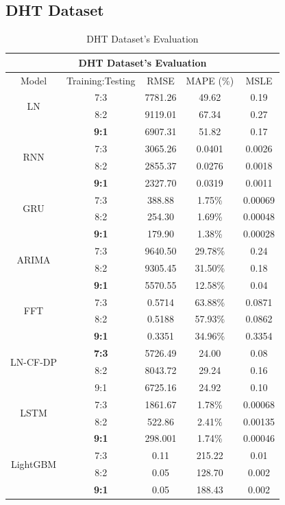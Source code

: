 \documentclass{ieeeojies}
\begin{document}
\vspace{-1em}

\subsection{DHT Dataset} 
\begin{table}[H]
    \centering
    \begin{tabular}{|c|c|c|c|c|}
         \hline
         \multicolumn{5}{|c|}{\textbf{DHT Dataset's Evaluation}}\\
         \hline
         \centering Model & Training:Testing & RMSE & MAPE (\%) & MSLE\\
         \hline
         \multirow{2}{*}{LN}& 7:3 & 7781.26 & 49.62 & 0.19\\ & 8:2 & 9119.01 & 67.34 & 0.27\\ & \textbf{9:1}& 6907.31& 51.82 & 0.17\\
         \hline
         \multirow{2}{*}{RNN} & 7:3&3065.26&0.0401&0.0026\\ & 8:2&2855.37&0.0276&0.0018\\ & \textbf{9:1} &2327.70 &0.0319 & 0.0011\\
         \hline
         \multirow{2}{*}{GRU} & 7:3	& 388.88 & 1.75\% & 0.00069 \\ & 8:2 & 254.30 & 1.69\% & 0.00048 \\ & \textbf{9:1} & 179.90 & 1.38\% & 0.00028 \\
         \hline
         \multirow{2}{*}{ARIMA} & 7:3 & 9640.50 & 29.78\% &0.24 \\ & 8:2 & 9305.45 &31.50\% & 0.18\\ & \textbf{9:1} &5570.55 &12.58\% & 0.04\\
         \hline
         \multirow{2}{*}{FFT}& 7:3	& 0.5714& 63.88\%& 0.0871\\ & 8:2 & 0.5188& 57.93\%& 0.0862\\ & \textbf{9:1} & 0.3351& 34.96\%& 0.3354\\
         \hline
        \multirow{2}{*}{LN-CF-DP} & \textbf{7:3} & 5726.49&24.00&0.08 \\ & 8:2 &8043.72& 29.24& 0.16\\ & 9:1 &6725.16&24.92&0.10\\
         \hline
         \multirow{2}{*}{LSTM}& 7:3& 1861.67& 1.78\%& 0.00068\\ & 8:2 & 522.86& 2.41\%& 0.00135\\ & \textbf{9:1}& 298.001& 1.74\%& 0.00046\\
         \hline
         \multirow{2}{*}{LightGBM}& 7:3& 0.11& 215.22 & 0.01\\ & 8:2 & 0.05& 128.70 & 0.002\\ & \textbf{9:1}& 0.05& 188.43 & 0.002\\
         \hline
    \end{tabular}
    \caption{DHT Dataset's Evaluation}
    \label{dhtresult}
\end{table}
\end{document}
